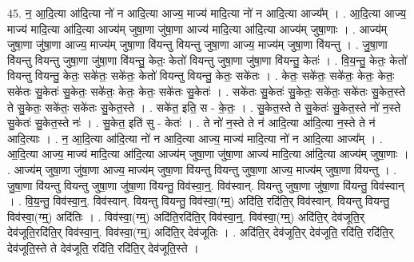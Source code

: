 \documentclass[17pt]{extarticle}
\begin{document}
45. न॒ आ॒दि॒त्या आ॑दि॒त्या नो॑ न आदि॒त्या आज्य॒ माज्य॑ मादि॒त्या नो॑ न आदि॒त्या आज्य᳚म् । . आ॒दि॒त्या आज्य॒ माज्य॑ मादि॒त्या आ॑दि॒त्या आज्य॑म् जुषा॒णा जु॑षा॒णा आज्य॑ मादि॒त्या आ॑दि॒त्या आज्य॑म् जुषा॒णाः । . आज्य॑म् जुषा॒णा जु॑षा॒णा आज्य॒ माज्य॑म् जुषा॒णा वि॑यन्तु वियन्तु जुषा॒णा आज्य॒ माज्य॑म् जुषा॒णा वि॑यन्तु । . जु॒षा॒णा वि॑यन्तु वियन्तु जुषा॒णा जु॑षा॒णा वि॑यन्तु॒ केतः॒ केतो॑ वियन्तु जुषा॒णा जु॑षा॒णा वि॑यन्तु॒ केतः॑ । . वि॒य॒न्तु॒ केतः॒ केतो॑ वियन्तु वियन्तु॒ केतः॒ सके॑तः॒ सके॑तः॒ केतो॑ वियन्तु वियन्तु॒ केतः॒ सके॑तः । . केतः॒ सके॑तः॒ सके॑तः॒ केतः॒ केतः॒ सके॑तः सु॒केतः॑ सु॒केतः॒ सके॑तः॒ केतः॒ केतः॒ सके॑तः सु॒केतः॑ । . सके॑तः सु॒केतः॑ सु॒केतः॒ सके॑तः॒ सके॑तः सु॒केत॒स्ते ते सु॒केतः॒ सके॑तः॒ सके॑तः सु॒केत॒स्ते । . सके॑त॒ इति॒ स - के॒तः॒ । . सु॒केत॒स्ते ते सु॒केतः॑ सु॒केत॒स्ते नो॑ न॒स्ते सु॒केतः॑ सु॒केत॒स्ते नः॑ । . सु॒केत॒ इति॑ सु - केतः॑ । . ते नो॑ न॒स्ते ते न॑ आदि॒त्या आ॑दि॒त्या न॒स्ते ते न॑ आदि॒त्याः । . न॒ आ॒दि॒त्या आ॑दि॒त्या नो॑ न आदि॒त्या आज्य॒ माज्य॑ मादि॒त्या नो॑ न आदि॒त्या आज्य᳚म् । . आ॒दि॒त्या आज्य॒ माज्य॑ मादि॒त्या आ॑दि॒त्या आज्य॑म् जुषा॒णा जु॑षा॒णा आज्य॑ मादि॒त्या आ॑दि॒त्या आज्य॑म् जुषा॒णाः । . आज्य॑म् जुषा॒णा जु॑षा॒णा आज्य॒ माज्य॑म् जुषा॒णा वि॑यन्तु वियन्तु जुषा॒णा आज्य॒ माज्य॑म् जुषा॒णा वि॑यन्तु । . जु॒षा॒णा वि॑यन्तु वियन्तु जुषा॒णा जु॑षा॒णा वि॑यन्तु॒ विव॑स्वा॒न्॒. विव॑स्वान्. वियन्तु जुषा॒णा जु॑षा॒णा वि॑यन्तु॒ विव॑स्वान् । . वि॒य॒न्तु॒ विव॑स्वा॒न्॒. विव॑स्वान्. वियन्तु वियन्तु॒ विव॑स्वा॒(ग्म्॒) अदि॑ति॒ रदि॑ति॒र् विव॑स्वान्. वियन्तु वियन्तु॒ विव॑स्वा॒(ग्म्॒) अदि॑तिः । . विव॑स्वा॒(ग्म्॒) अदि॑ति॒रदि॑ति॒र् विव॑स्वा॒न्॒. विव॑स्वा॒(ग्म्॒) अदि॑ति॒र् देव॑जूति॒र् देव॑जूति॒रदि॑ति॒र् विव॑स्वा॒न्॒. विव॑स्वा॒(ग्म्॒) अदि॑ति॒र् देव॑जूतिः । . अदि॑ति॒र् देव॑जूति॒र् देव॑जूति॒ रदि॑ति॒ रदि॑ति॒र् देव॑जूति॒स्ते ते देव॑जूति॒ रदि॑ति॒ रदि॑ति॒र् देव॑जूति॒स्ते । \newline
\end{document}
